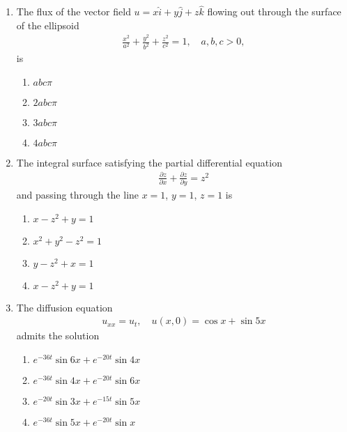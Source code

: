 \documentclass[journal]{IEEEtran}
\numberwithin{equation}{enumi}
\numberwithin{figure}{enumi}
\begin{document}
\begin{enumerate}
\item
The flux of the vector field $u = x \hat{i} + y \hat{j} + z \hat{k}$ flowing out through the surface of the ellipsoid
\begin{align}
\frac{x^2}{a^2} + \frac{y^2}{b^2} + \frac{z^2}{c^2} = 1, \quad a,b,c > 0,
\end{align}
is
\hfill{}
\begin{multicols}{4}
\begin{enumerate}
\item $abc \pi$
\item $2 abc \pi$
\item $3 abc \pi$
\item $4 abc \pi$
\end{enumerate}
\end{multicols}

\item
The integral surface satisfying the partial differential equation
\begin{align}
\frac{\partial z}{\partial x} + \frac{\partial z}{\partial y} = z^2
\end{align}
and passing through the line $x=1$, $y=1$, $z=1$ is
\hfill{}
\begin{multicols}{2}
\begin{enumerate}
\item $x - z^2 + y = 1$
\item $x^2 + y^2 - z^2 = 1$
\item $y - z^2 + x = 1$
\item $x - z^2 + y = 1$
\end{enumerate}
\end{multicols}

\item
The diffusion equation
\begin{align}
u_{xx} = u_t, \quad u(x,0) = \cos x + \sin 5x
\end{align}
admits the solution
\hfill{}
\begin{multicols}{2}
\begin{enumerate}
\item $e^{-36t} \sin 6x + e^{-20t} \sin 4x$
\item $e^{-36t} \sin 4x + e^{-20t} \sin 6x$
\item $e^{-20t} \sin 3x + e^{-15t} \sin 5x$
\item $e^{-36t} \sin 5x + e^{-20t} \sin x$
\end{enumerate}
\end{multicols}


\end{enumerate}
\end{document}
